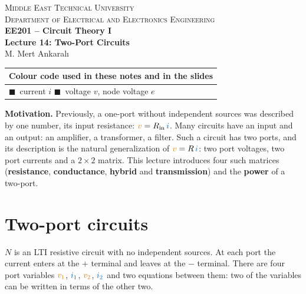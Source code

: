 \documentclass[11pt,a4paper]{article}
\newcommand{\Icol}[1]{\textcolor{ccur}{#1}}
\newcommand{\Vcol}[1]{\textcolor{cvolt}{#1}}
\newcommand{\Rin}{R_{\mathrm{in}}}
\newcommand{\vone}{\Vcol{v_1}}  \newcommand{\vtwo}{\Vcol{v_2}}
\newcommand{\ione}{\Icol{i_1}}  \newcommand{\itwo}{\Icol{i_2}}
\newcommand{\pone}[2]{%
  \draw (#1,#2) node[ocirc] {}; \draw (#1,0) node[ocirc] {};
  \draw[iar] (#1+0.2,#2+0.28) -- (#1+0.75,#2+0.28); \node[font=\small, text=ccur] at (#1+0.48,#2+0.58) {$i_1$};
  \node[pol] at (#1+0.3,0.72*#2) {$+$}; \node[pol] at (#1+0.3,0.22*#2) {$-$};
  \node[font=\small, text=cvolt] at (#1+0.32,0.47*#2) {$v_1$};}
\newcommand{\ptwo}[2]{%
  \draw (#1,#2) node[ocirc] {}; \draw (#1,0) node[ocirc] {};
  \draw[iar] (#1-0.2,#2+0.28) -- (#1-0.75,#2+0.28); \node[font=\small, text=ccur] at (#1-0.48,#2+0.58) {$i_2$};
  \node[pol] at (#1-0.3,0.72*#2) {$+$}; \node[pol] at (#1-0.3,0.22*#2) {$-$};
  \node[font=\small, text=cvolt] at (#1-0.32,0.47*#2) {$v_2$};}
\newcommand{\tpbox}[1]{%
  \draw[elem] (1.0,-0.2) rectangle (3.4,2.2);
  \node[align=center, font=\small] at (2.2,1.0) {#1};
  \draw (0,1.8) -- (1.0,1.8); \draw (0,0) -- (1.0,0);
  \draw (3.4,1.8) -- (4.4,1.8); \draw (3.4,0) -- (4.4,0);
  \pone{0}{1.8} \ptwo{4.4}{1.8}}
\begin{document}
\begin{center}
\begin{tcolorbox}[enhanced, colback=metured!5, colframe=metured, boxrule=1pt,
                  arc=3pt, left=10pt,right=10pt,top=7pt,bottom=7pt, width=\textwidth]
\begin{center}
  {\small\scshape Middle East Technical University}\\[2pt]
  {\small\scshape Department of Electrical and Electronics Engineering}\\[7pt]
  {\Large\bfseries\color{metured} EE201 -- Circuit Theory I}\\[4pt]
  {\large\bfseries Lecture 14: Two-Port Circuits}\\[6pt]
  {\small M. Mert Ankaral{\i}}
\end{center}
\end{tcolorbox}
\end{center}
\vspace{-0.5em}

\begin{center}
\small
\begin{tabular}{@{}l@{}}
\toprule
\textbf{Colour code used in these notes and in the slides}\\
\midrule
\Icol{$\blacksquare$}~current $i$ \quad
\Vcol{$\blacksquare$}~voltage $v$, node voltage $e$\\
\bottomrule
\end{tabular}
\end{center}

\textbf{Motivation.} Previously, a one-port without independent sources was described by one
number, its input resistance: $\Vcol{v} = \Rin\,\Icol{i}$. Many circuits have an input and an
output: an amplifier, a transformer, a filter. Such a circuit has two ports, and its
description is the natural generalization of $\Vcol{v} = R\,\Icol{i}$: two port voltages, two
port currents and a $2 \times 2$ matrix. This lecture introduces four such matrices
(\textbf{resistance}, \textbf{conductance}, \textbf{hybrid} and \textbf{transmission}) and the
\textbf{power} of a two-port.

\section{Two-port circuits}

\begin{minipage}[c]{0.46\linewidth}
\centering
{}
\end{minipage}\hfill
\begin{minipage}[c]{0.5\linewidth}
$N$ is an LTI resistive circuit with no independent sources. At each port the current enters
at the $+$ terminal and leaves at the $-$ terminal. There are four port variables
$\vone$, $\ione$, $\vtwo$, $\itwo$ and two equations between them: two of the variables can
be written in terms of the other two.
\end{minipage}
\end{document}
